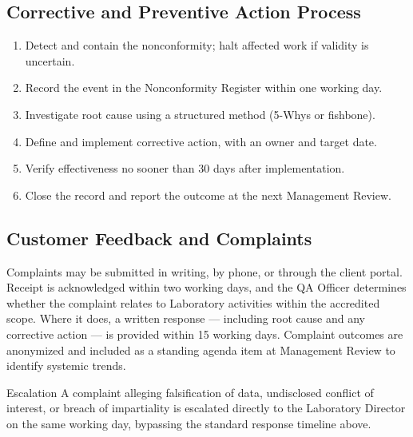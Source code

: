 \subsection{Corrective and Preventive Action Process}

\begin{enumerate}
  \item Detect and contain the nonconformity; halt affected work if validity is uncertain.
  \item Record the event in the Nonconformity Register within one working day.
  \item Investigate root cause using a structured method (5-Whys or fishbone).
  \item Define and implement corrective action, with an owner and target date.
  \item Verify effectiveness no sooner than 30 days after implementation.
  \item Close the record and report the outcome at the next Management Review.
\end{enumerate}

\subsection{Customer Feedback and Complaints}

Complaints may be submitted in writing, by phone, or through the client portal. Receipt is
acknowledged within two working days, and the QA Officer determines whether the complaint
relates to Laboratory activities within the accredited scope. Where it does, a written
response --- including root cause and any corrective action --- is provided within 15
working days. Complaint outcomes are anonymized and included as a standing agenda item at
Management Review to identify systemic trends.

\begin{notebox}{Escalation}
A complaint alleging falsification of data, undisclosed conflict of interest, or breach of
impartiality is escalated directly to the Laboratory Director on the same working day,
bypassing the standard response timeline above.
\end{notebox}
